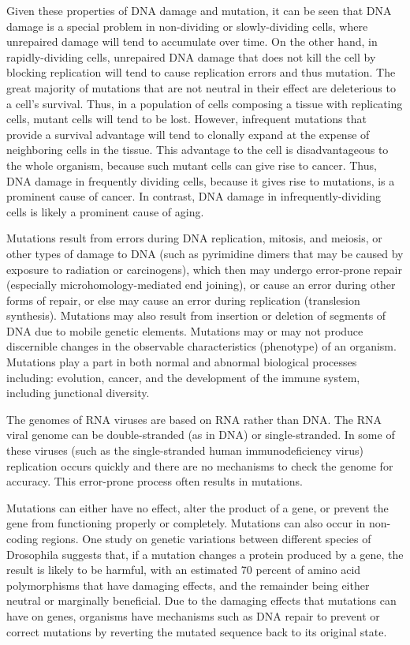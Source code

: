 Given these properties of DNA damage and mutation, it can be seen that DNA damage is a special problem in non-dividing or slowly-dividing cells, where unrepaired damage will tend to accumulate over time. On the other hand, in rapidly-dividing cells, unrepaired DNA damage that does not kill the cell by blocking replication will tend to cause replication errors and thus mutation. The great majority of mutations that are not neutral in their effect are deleterious to a cell's survival. Thus, in a population of cells composing a tissue with replicating cells, mutant cells will tend to be lost. However, infrequent mutations that provide a survival advantage will tend to clonally expand at the expense of neighboring cells in the tissue. This advantage to the cell is disadvantageous to the whole organism, because such mutant cells can give rise to cancer. Thus, DNA damage in frequently dividing cells, because it gives rise to mutations, is a prominent cause of cancer. In contrast, DNA damage in infrequently-dividing cells is likely a prominent cause of aging.

Mutations result from errors during DNA replication, mitosis, and meiosis, or other types of damage to DNA (such as pyrimidine dimers that may be caused by exposure to radiation or carcinogens), which then may undergo error-prone repair (especially microhomology-mediated end joining), or cause an error during other forms of repair, or else may cause an error during replication (translesion synthesis). Mutations may also result from insertion or deletion of segments of DNA due to mobile genetic elements. Mutations may or may not produce discernible changes in the observable characteristics (phenotype) of an organism. Mutations play a part in both normal and abnormal biological processes including: evolution, cancer, and the development of the immune system, including junctional diversity.

The genomes of RNA viruses are based on RNA rather than DNA. The RNA viral genome can be double-stranded (as in DNA) or single-stranded. In some of these viruses (such as the single-stranded human immunodeficiency virus) replication occurs quickly and there are no mechanisms to check the genome for accuracy. This error-prone process often results in mutations.

Mutations can either have no effect, alter the product of a gene, or prevent the gene from functioning properly or completely. Mutations can also occur in non-coding regions. One study on genetic variations between different species of Drosophila suggests that, if a mutation changes a protein produced by a gene, the result is likely to be harmful, with an estimated 70 percent of amino acid polymorphisms that have damaging effects, and the remainder being either neutral or marginally beneficial. Due to the damaging effects that mutations can have on genes, organisms have mechanisms such as DNA repair to prevent or correct mutations by reverting the mutated sequence back to its original state.


